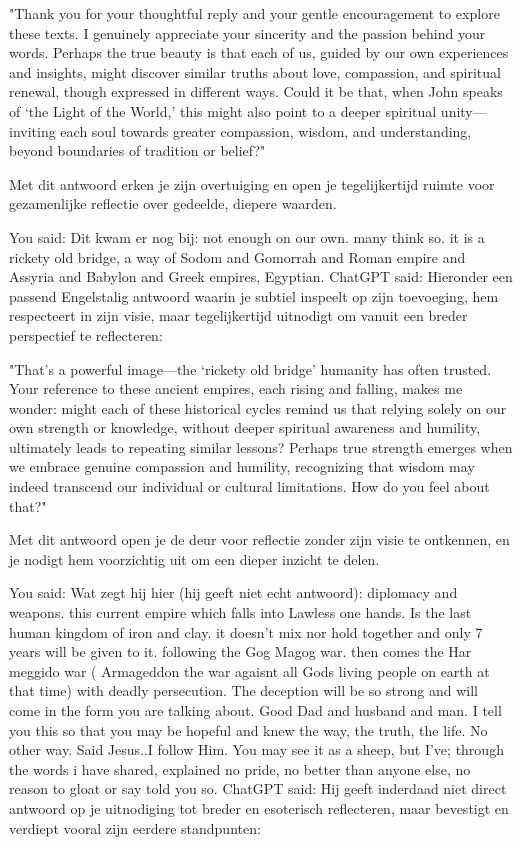 "Thank you for your thoughtful reply and your gentle encouragement to explore these texts. I genuinely appreciate your sincerity and the passion behind your words. Perhaps the true beauty is that each of us, guided by our own experiences and insights, might discover similar truths about love, compassion, and spiritual renewal, though expressed in different ways. Could it be that, when John speaks of ‘the Light of the World,’ this might also point to a deeper spiritual unity—inviting each soul towards greater compassion, wisdom, and understanding, beyond boundaries of tradition or belief?"

Met dit antwoord erken je zijn overtuiging en open je tegelijkertijd ruimte voor gezamenlijke reflectie over gedeelde, diepere waarden.

You said:
Dit kwam er nog bij: not enough on our own.  many think so.  it is a rickety old bridge, a way of Sodom and Gomorrah and Roman empire and Assyria and Babylon and Greek empires, Egyptian.
ChatGPT said:
Hieronder een passend Engelstalig antwoord waarin je subtiel inspeelt op zijn toevoeging, hem respecteert in zijn visie, maar tegelijkertijd uitnodigt om vanuit een breder perspectief te reflecteren:

"That's a powerful image—the ‘rickety old bridge’ humanity has often trusted. Your reference to these ancient empires, each rising and falling, makes me wonder: might each of these historical cycles remind us that relying solely on our own strength or knowledge, without deeper spiritual awareness and humility, ultimately leads to repeating similar lessons? Perhaps true strength emerges when we embrace genuine compassion and humility, recognizing that wisdom may indeed transcend our individual or cultural limitations. How do you feel about that?"

Met dit antwoord open je de deur voor reflectie zonder zijn visie te ontkennen, en je nodigt hem voorzichtig uit om een dieper inzicht te delen.

You said:
Wat zegt hij hier (hij geeft niet echt antwoord): diplomacy and weapons.  this current empire which falls into Lawless one hands. Is the last human kingdom of iron and clay.  it doesn't mix nor hold together and only 7 years will be given to it.  following the Gog Magog war.  then comes the Har meggido war ( Armageddon the war agaisnt all Gods living people on earth at that time)  with deadly persecution. The deception will be so strong and will come in the form you are talking about.  Good Dad and husband and man.  I tell you this so that you may be hopeful and knew the way, the truth,  the life.  No other way.  Said Jesus..I follow Him.  You may see it as a sheep,  but I've; through the words i have shared, explained no pride, no better than anyone else,  no reason  to gloat or say told you so.
ChatGPT said:
Hij geeft inderdaad niet direct antwoord op je uitnodiging tot breder en esoterisch reflecteren, maar bevestigt en verdiept vooral zijn eerdere standpunten:

